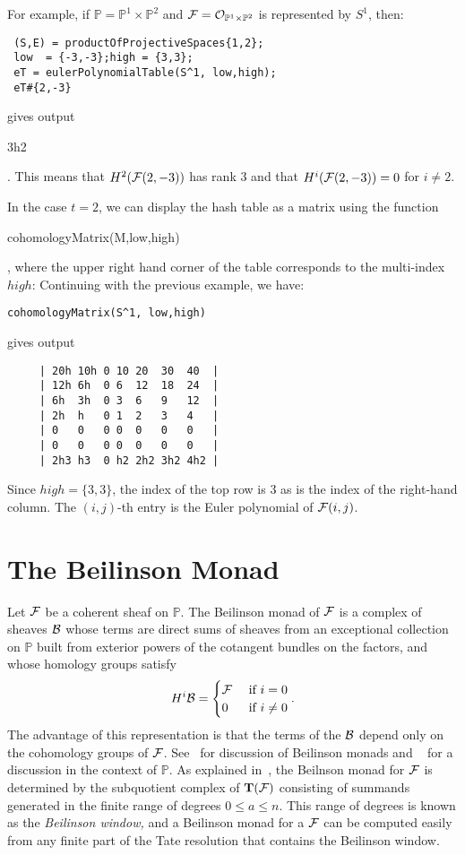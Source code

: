 \documentclass[twoside,12pt, leqno]{amsart}
\def\PP{{\mathbb P}}
\def\bT{{\bf T}}
\begin{document}
For example,  if $\PP=\PP^1\times \PP^2$ and   $\sF = \sO_{\PP^1\times \PP^2}$ is represented by $S^1$, then:
{\small \begin{verbatim}
 (S,E) = productOfProjectiveSpaces{1,2};
 low  = {-3,-3};high = {3,3};
 eT = eulerPolynomialTable(S^1, low,high);
 eT#{2,-3}
\end{verbatim}}
\noindent gives output
\begin{verb}
3h2
\end{verb}.
This means that $H^2({\mathcal F}(2,-3))$ has rank $3$ and that $H^i({\mathcal F}(2,-3)) = 0$ for $i\ne 2$.

In the case $t=2$, we can display the hash table as a matrix using the function
\begin{verb}
 cohomologyMatrix(M,low,high)
\end{verb},
where the upper right hand corner of the table corresponds to the multi-index $high$: Continuing with the previous example,
we have:
{\small \begin{verbatim}
cohomologyMatrix(S^1, low,high)
\end{verbatim}}
\noindent gives output
{\small 
\begin{verbatim}
     | 20h 10h 0 10 20  30  40  |
     | 12h 6h  0 6  12  18  24  |
     | 6h  3h  0 3  6   9   12  |
     | 2h  h   0 1  2   3   4   |
     | 0   0   0 0  0   0   0   |
     | 0   0   0 0  0   0   0   |
     | 2h3 h3  0 h2 2h2 3h2 4h2 |
\end{verbatim}}
\noindent Since $high = \{3,3\}$, the index of the top row is 3 as is the index of the right-hand column. 
The $(i,j)$-th entry is the Euler polynomial of ${\mathcal F}(i,j)$. 

\section{The Beilinson Monad}\label{sec:beilinson monad}
Let ${\mathcal F}$ be a coherent sheaf on $\PP$.  The Beilinson monad of ${\mathcal F}$ is a complex of sheaves ${\mathcal B}$ whose terms are direct sums of sheaves from an exceptional collection on $\PP$ built from exterior powers of the cotangent bundles on the factors, and whose homology groups satisfy
\[
H^{i}{\mathcal B} = \begin{cases} {\mathcal F} & \text{ if } i=0\\
0& \text{ if } i \ne 0 
\end{cases}.
\]
The advantage of this representation is that the terms of the ${\mathcal B}$ depend only on the cohomology groups of
${\mathcal F}$. See~\cite{beilinson,AO,EFS,Huy} for discussion of Beilinson monads and ~\cite[\S2]{EES} for a discussion in the context of $\PP$.  As explained in~\cite[\S2]{EES}, the Beilnson monad for ${\mathcal F}$ is determined by the subquotient complex of $\bT(\sF)$ consisting of summands generated in the finite range of degrees $0\leq a \leq n$.  This range of degrees is known as the {\em Beilinson window,} and a Beilinson monad for a ${\mathcal F}$ can be  computed easily from any finite part of the Tate resolution that contains the Beilinson window.  
\end{document}

